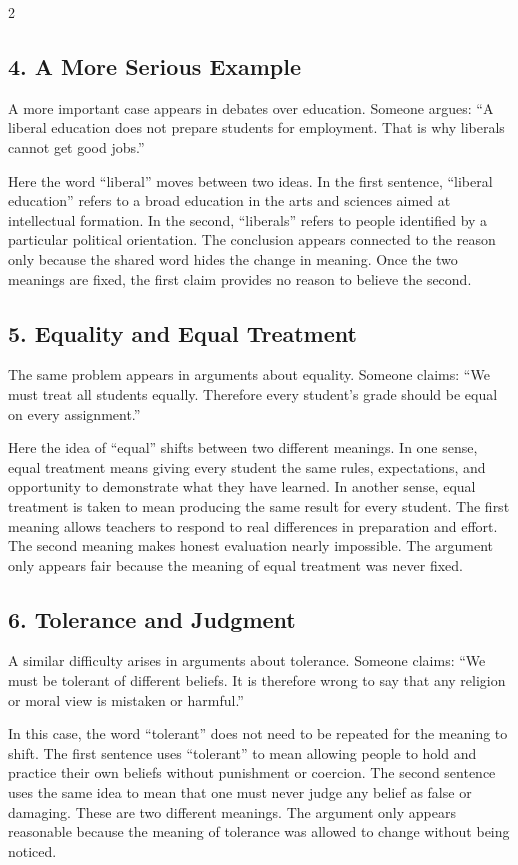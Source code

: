 \documentclass[12pt]{article}
\begin{document}
\begin{multicols}{2}
\subsection*{4. A More Serious Example}
A more important case appears in debates over education. Someone argues: “A liberal education does not prepare students for employment. That is why liberals cannot get good jobs.”

Here the word “liberal” moves between two ideas. In the first sentence, “liberal education” refers to a broad education in the arts and sciences aimed at intellectual formation. In the second, “liberals” refers to people identified by a particular political orientation. The conclusion appears connected to the reason only because the shared word hides the change in meaning. Once the two meanings are fixed, the first claim provides no reason to believe the second.

\subsection*{5. Equality and Equal Treatment}
The same problem appears in arguments about equality. Someone claims: “We must treat all students equally. Therefore every student’s grade should be equal on every assignment.”

Here the idea of “equal” shifts between two different meanings. In one sense, equal treatment means giving every student the same rules, expectations, and opportunity to demonstrate what they have learned. In another sense, equal treatment is taken to mean producing the same result for every student. The first meaning allows teachers to respond to real differences in preparation and effort. The second meaning makes honest evaluation nearly impossible. The argument only appears fair because the meaning of equal treatment was never fixed.

\subsection*{6. Tolerance and Judgment}
A similar difficulty arises in arguments about tolerance. Someone claims: “We must be tolerant of different beliefs. It is therefore wrong to say that any religion or moral view is mistaken or harmful.”

In this case, the word “tolerant” does not need to be repeated for the meaning to shift. The first sentence uses “tolerant” to mean allowing people to hold and practice their own beliefs without punishment or coercion. The second sentence uses the same idea to mean that one must never judge any belief as false or damaging. These are two different meanings. The argument only appears reasonable because the meaning of tolerance was allowed to change without being noticed.


\end{multicols}
\end{document}

